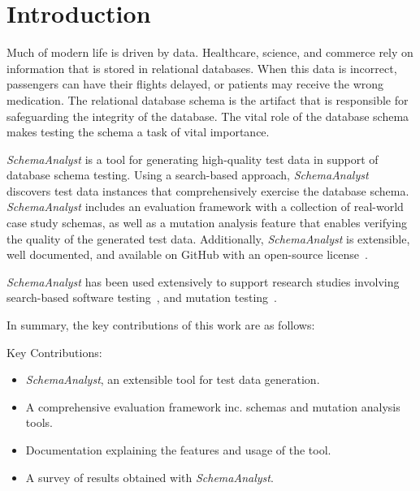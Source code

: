 \section{Introduction}

Much of modern life is driven by data.  Healthcare, science, and commerce rely on information that is
stored in relational databases.  When this data is incorrect, passengers can have their flights
delayed, or patients may receive the wrong medication. The relational database schema is the artifact
that is responsible for safeguarding the integrity of the database. The vital role of the database
schema makes testing the schema a task of vital importance.

\textit{SchemaAnalyst} is a tool for generating high-quality test data in support of database schema
testing. Using a search-based approach, \textit{SchemaAnalyst} discovers test data instances that
comprehensively exercise the database schema. \textit{SchemaAnalyst} includes an evaluation framework
with a collection of real-world case study schemas, as well as a mutation analysis feature
that enables verifying the quality of the generated test data. Additionally, \textit{SchemaAnalyst}
is extensible, well documented, and available on GitHub with an open-source license~\cite{tool}.

\textit{SchemaAnalyst} has been used extensively to support research studies involving search-based
software testing~\cite{kapfhammer2013search,mcminn2015effectiveness,kinneer2015automatically}, and
mutation testing~\cite{wright2013efficient,wright2014impact,wright2015mutation}.

In summary, the key contributions of this work are as follows:

Key Contributions:
\begin{itemize}
\item \textit{SchemaAnalyst}, an extensible tool for test data generation.
\item A comprehensive evaluation framework inc. schemas and mutation analysis tools.
\item Documentation explaining the features and usage of the tool.
\item A survey of results obtained with \textit{SchemaAnalyst}.
\end{itemize}
